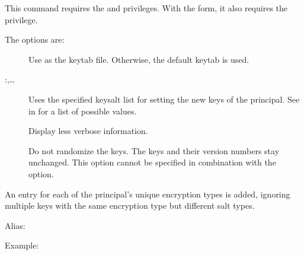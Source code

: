 \documentclass[letterpaper,10pt,english]{sphinxmanual}
\begin{document}
This command requires the  and  privileges.
With the  form, it also requires the  privilege.

The options are:
\begin{description}
\item[{ }] \leavevmode
Use  as the keytab file.  Otherwise, the default keytab is
used.

\item[{ :,…}] \leavevmode
Uses the specified keysalt list for setting the new keys of the
principal.  See {\hyperref[\detokenize{admin/conf_files/kdc_conf:keysalt-lists}]{}} in {\hyperref[\detokenize{admin/conf_files/kdc_conf:kdc-conf-5}]{}} for a
list of possible values.

\item[{}] \leavevmode
Display less verbose information.

\item[{}] \leavevmode
Do not randomize the keys. The keys and their version numbers stay
unchanged.  This option cannot be specified in combination with the
 option.

\end{description}

An entry for each of the principal’s unique encryption types is added,
ignoring multiple keys with the same encryption type but different
salt types.

Alias: 

Example:

%
\begin{sphinxVerbatim}[commandchars=\\\{\}]
    
      
          
\end{sphinxVerbatim}
\label{\detokenize{admin/admin_commands/kadmin_local:ktadd-end}}
\end{document}
